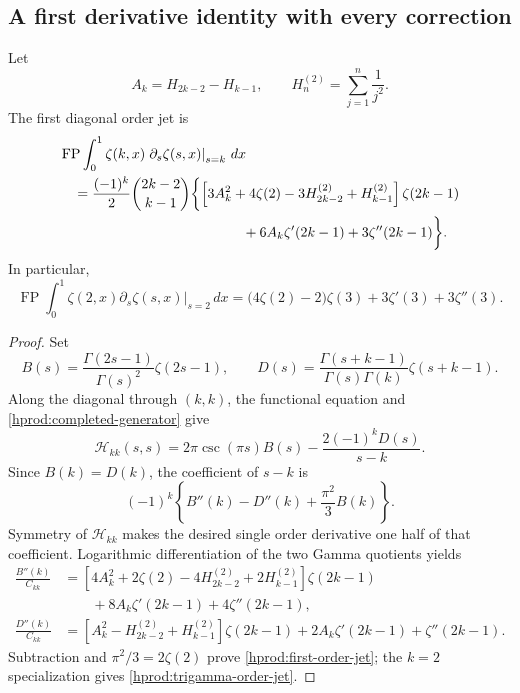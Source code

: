 \subsection{A first derivative identity with every correction}

Let
\[
 A_k=H_{2k-2}-H_{k-1},\qquad
 H_n^{(2)}=\sum_{j=1}^n\frac1{j^2}.
\]
The first diagonal order jet is
\begin{equation}\label{hprod:first-order-jet}
 \begin{split}
 &\operatorname{FP}\int_0^1\zeta(k,x)
     \left.\partial_s\zeta(s,x)\right|_{s=k}\,dx\\
 &\quad=\frac{(-1)^k}{2}\binom{2k-2}{k-1}
 \biggl\{
 \left[3A_k^2+4\zeta(2)-3H_{2k-2}^{(2)}+H_{k-1}^{(2)}\right]
        \zeta(2k-1)\\
 &\hspace{46mm}+6A_k\zeta'(2k-1)+3\zeta''(2k-1)
 \biggr\}.
 \end{split}
\end{equation}
In particular,
\begin{equation}\label{hprod:trigamma-order-jet}
 \operatorname{FP}\int_0^1\zeta(2,x)
     \left.\partial_s\zeta(s,x)\right|_{s=2}\,dx
 =\bigl(4\zeta(2)-2\bigr)\zeta(3)
   +3\zeta'(3)+3\zeta''(3).
\end{equation}

\begin{proof}
Set
\[
 B(s)=\frac{\Gamma(2s-1)}{\Gamma(s)^2}\zeta(2s-1),\qquad
 D(s)=\frac{\Gamma(s+k-1)}{\Gamma(s)\Gamma(k)}\zeta(s+k-1).
\]
Along the diagonal through $(k,k)$, the functional equation and
\eqref{hprod:completed-generator} give
\[
 \mathscr H_{kk}(s,s)=2\pi\csc(\pi s)B(s)
                   -\frac{2(-1)^kD(s)}{s-k}.
\]
Since $B(k)=D(k)$, the coefficient of $s-k$ is
\[
 (-1)^k\left\{B''(k)-D''(k)+\frac{\pi^2}{3}B(k)\right\}.
\]
Symmetry of $\mathscr H_{kk}$ makes the desired single order
derivative one half of that coefficient.  Logarithmic differentiation
of the two Gamma quotients yields
\begin{align*}
 \frac{B''(k)}{C_{kk}}
 &=\left[4A_k^2+2\zeta(2)-4H_{2k-2}^{(2)}+2H_{k-1}^{(2)}\right]
       \zeta(2k-1)\\
 &\qquad+8A_k\zeta'(2k-1)+4\zeta''(2k-1),\\
 \frac{D''(k)}{C_{kk}}
 &=\left[A_k^2-H_{2k-2}^{(2)}+H_{k-1}^{(2)}\right]
       \zeta(2k-1)
       +2A_k\zeta'(2k-1)+\zeta''(2k-1).
\end{align*}
Subtraction and $\pi^2/3=2\zeta(2)$ prove
\eqref{hprod:first-order-jet}; the $k=2$ specialization gives
\eqref{hprod:trigamma-order-jet}.
\end{proof}

